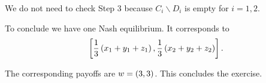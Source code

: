 \begin{enumerate} [label=\Alph*. ]
We do not need to check Step 3 because $C_{i} \backslash D_{i}$ is empty for $i = 1, 2$.
\end{enumerate}



To conclude we have one Nash equilibrium. It corresponds to
\begin{equation*}
    \left[\dfrac{1}{3} \left(x_1 + y_1 + z_1\right), \dfrac{1}{3} \left(x_2 + y_2 + z_2\right)\right].    
\end{equation*}

The corresponding payoffs are $w = \left(3,3\right)$. This concludes the exercise.